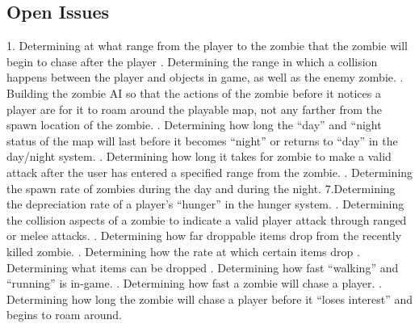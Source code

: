 \documentclass[12pt, titlepage]{article}
\begin{document}
\subsection{Open Issues}
1. Determining at what range from the player to the zombie that the zombie will begin to chase after the player
. Determining the range in which a collision happens between the player and objects in game, as well as the enemy zombie.
. Building the zombie AI so that the actions of the zombie before it notices a player are for it to roam around the playable map, not any farther from the spawn location of the zombie.
. Determining how long the “day” and “night status of the map will last before it becomes “night” or returns to “day” in the day/night system.
. Determining how long it takes for zombie to make a valid attack after the user has entered a specified range from the zombie.
. Determining the spawn rate of zombies during the day and during the night.
\newline
7.Determining the depreciation rate of a player’s “hunger” in the hunger system.
. Determining the collision aspects of a zombie to indicate a valid player attack through ranged or melee attacks.
. Determining how far droppable items drop from the recently killed zombie.
. Determining how the rate at which certain items drop
. Determining what items can be dropped
. Determining how fast “walking” and “running” is in-game.
. Determining how fast a zombie will chase a player.
. Determining how long the zombie will chase a player before it “loses interest” and begins to roam around.


\end{document}
